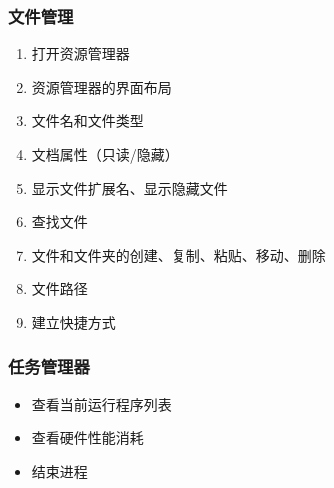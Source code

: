 \documentclass[dvipsnames, svgnames, x11names]{beamer}
\begin{document}
\begin{frame}
    \frametitle{文件管理}
    \begin{enumerate}
      \item 打开资源管理器
      \item 资源管理器的界面布局
      \item 文件名和文件类型
      \item 文档属性（只读/隐藏）
      \item 显示文件扩展名、显示隐藏文件
      \item 查找文件
      \item 文件和文件夹的创建、复制、粘贴、移动、删除
      \item 文件路径
      \item 建立快捷方式
    \end{enumerate}
\end{frame}

\begin{frame}
    \frametitle{任务管理器}
    \begin{itemize}
      \item 查看当前运行程序列表
      \item 查看硬件性能消耗
      \item 结束进程
    \end{itemize}
\end{frame}
\end{document}
